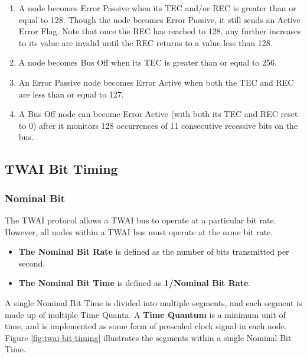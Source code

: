 \documentclass[main\_\_EN.tex]{subfiles}
\begin{document}
\begin{enumerate}
\begin{itemize}
        \item If the REC is between 1 and 127, the REC will be decremented by 1.
        \item If the REC is greater than 127, the REC will be set to 127.
        \item If the REC is 0, the REC will remain 0.
    \end{itemize}
    \item A node becomes Error Passive when its TEC and/or REC is greater than or equal to 128. Though the node becomes Error Passive, it still sends an Active Error Flag. Note that once the REC has reached to 128, any further increases to its value are invalid until the REC returns to a value less than 128.
    \item A node becomes Bus Off when its TEC is greater than or equal to 256.
    \item An Error Passive node becomes Error Active when both the TEC and REC are less than or equal to 127.
    \item A Bus Off node can become Error Active (with both its TEC and REC reset to 0) after it monitors 128 occurrences of 11 consecutive recessive bits on the bus.
\end{enumerate}

\subsection{TWAI Bit Timing}
\subsubsection{Nominal Bit}

The TWAI protocol allows a TWAI bus to operate at a particular bit rate. However, all nodes within a TWAI bus must operate at the same bit rate.

\begin{itemize}
    \item \textbf{The Nominal Bit Rate} is defined as the number of bits transmitted per second.
    \item \textbf{The Nominal Bit Time} is defined as \textbf{1/Nominal Bit Rate}.
\end{itemize}

A single Nominal Bit Time is divided into multiple segments, and each segment is made up of multiple Time Quanta. A \textbf{Time Quantum} is a minimum unit of time, and is implemented as some form of prescaled clock signal in each node. Figure \ref{fig:twai-bit-timing} illustrates the segments within a single Nominal Bit Time.
\end{document}
